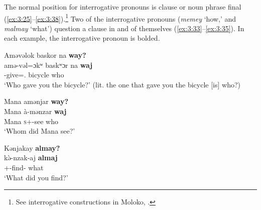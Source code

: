 \begin{table}
\caption{Interrogative pronouns\label{tab:3.19}}
\end{table}

The normal position for interrogative pronouns is clause or noun phrase final (\ref{ex:3:25}--\ref{ex:3:38}).\footnote{See interrogative constructions in Moloko, .}  Two of the interrogative pronouns (\textit{memey} ‘how,’ and \textit{malmay} ‘what’) question a clause in and of themselves (\ref{ex:3:33}--\ref{ex:3:35}). In each example, the interrogative pronoun is bolded. 

\noindent\parbox{\textwidth}{\ea \label{ex:3:25}
Aməvəlok  baskor  na  \textbf{way?}\\
\gll  amə-vəl=ɔkʷ baskʷɔr   na   \textbf{waj}\\
      {\DEP}-give={\twoS}.{\IO}  bicycle  {\PSP}  who\\
\glt  ‘Who gave you the bicycle?’ (lit. the one that gave you the bicycle [is] who?)
\z}

\ea \label{ex:3:26}
Mana  amənjar  \textbf{way?}\\
\gll  Mana   à-mənzar   \textbf{waj}\\
      Mana  \textsc{s}+{\PFV}-see  who\\
\glt  ‘Whom did Mana see?’
\z

\ea \label{ex:3:27}
Kənjakay  \textbf{almay?}\\
\gll  k\`{ə}-nzak-aj    \textbf{almaj}\\
      {\twoS}+{\PFV}-find-{\CL}  what\\
\glt  ‘What did you find?’
\z

